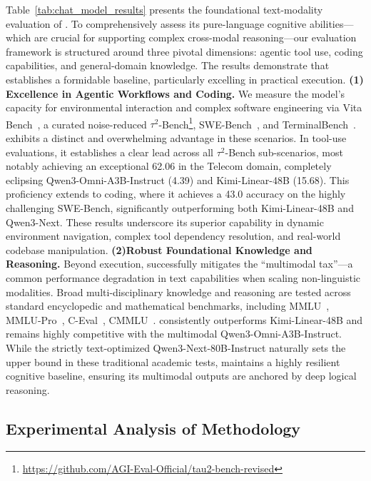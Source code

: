 Table~\ref{tab:chat_model_results} presents the foundational text-modality evaluation of \longcat. To comprehensively assess its pure-language cognitive abilities—which are crucial for supporting complex cross-modal reasoning—our evaluation framework is structured around three pivotal dimensions: agentic tool use, coding capabilities, and general-domain knowledge. The results demonstrate that \longcat establishes a formidable baseline, particularly excelling in practical execution. \textbf{(1) Excellence in Agentic Workflows and Coding.} We measure the model's capacity for environmental interaction and complex software engineering via Vita Bench~\cite{he2025vitabench}, a curated noise-reduced $\tau^2$-Bench\footnote{\url{https://github.com/AGI-Eval-Official/tau2-bench-revised}}, SWE-Bench~\cite{jimenez2023swe}, and TerminalBench~\cite{merrill2026terminalbenchbenchmarkingagentshard}. \longcat exhibits a distinct and overwhelming advantage in these scenarios. In tool-use evaluations, it establishes a clear lead across all $\tau^2$-Bench sub-scenarios, most notably achieving an exceptional 62.06 in the Telecom domain, completely eclipsing Qwen3-Omni-A3B-Instruct (4.39) and Kimi-Linear-48B (15.68). This proficiency extends to coding, where it achieves a 43.0 accuracy on the highly challenging SWE-Bench, significantly outperforming both Kimi-Linear-48B and Qwen3-Next. These results underscore its superior capability in dynamic environment navigation, complex tool dependency resolution, and real-world codebase manipulation. \textbf{(2)Robust Foundational Knowledge and Reasoning.} Beyond execution, \longcat successfully mitigates the ``multimodal tax''—a common performance degradation in text capabilities when scaling non-linguistic modalities. Broad multi-disciplinary knowledge and reasoning are tested across standard encyclopedic and mathematical benchmarks, including MMLU~\cite{hendrycks2021measuringmassivemultitasklanguage}, MMLU-Pro~\cite{wang2024mmluprorobustchallengingmultitask}, C-Eval~\cite{huang2023ceval}, CMMLU~\cite{li2023cmmlu}. \longcat consistently outperforms Kimi-Linear-48B and remains highly competitive with the multimodal Qwen3-Omni-A3B-Instruct. While the strictly text-optimized Qwen3-Next-80B-Instruct naturally sets the upper bound in these traditional academic tests, \longcat maintains a highly resilient cognitive baseline, ensuring its multimodal outputs are anchored by deep logical reasoning.



\subsection{Experimental Analysis of Methodology}
\label{sec:model_analysis}

